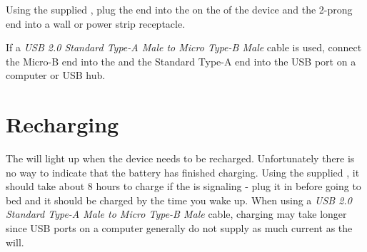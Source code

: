 Using the supplied , plug the  end into the  on the
 of the device and the 2-prong end into a wall or power strip receptacle.

\par\medskip

If a \textit{USB 2.0 Standard Type-A Male to Micro Type-B Male} cable is used,
connect the Micro-B end into the  and the Standard Type-A end into the
USB port on a computer or USB hub.

\section{Recharging} \label{Recharging}

The \hyperref[Low Battery Indicator]{} will light up when the device
needs to be recharged.  Unfortunately there is no way to indicate that the
battery has finished charging. Using the supplied
\hyperref[Power Adapter]{}, it should take about \num{8} hours to charge
if the  is signaling - plug it in before going to bed and it should be
charged by the time you wake up.  When using a \textit{USB 2.0 Standard Type-A
Male to Micro Type-B Male} cable, charging may take longer since USB ports on a
computer generally do not supply as much current as the  will.

